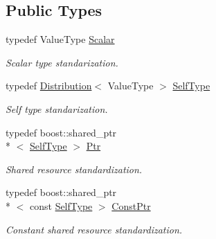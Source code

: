 \subsection*{Public Types}
\begin{DoxyCompactItemize}
\item 
typedef Value\-Type \hyperlink{classffnn_1_1distribution_1_1_distribution_af0757b85660b34a2ae32a285cfdbfd1d}{Scalar}
\begin{DoxyCompactList}\small\item\em Scalar type standarization. \end{DoxyCompactList}\item 
typedef \hyperlink{classffnn_1_1distribution_1_1_distribution}{Distribution}$<$ Value\-Type $>$ \hyperlink{classffnn_1_1distribution_1_1_distribution_ae1a3da8f16a034d6c051fcfdcf69f0d2}{Self\-Type}
\begin{DoxyCompactList}\small\item\em Self type standarization. \end{DoxyCompactList}\item 
typedef boost\-::shared\-\_\-ptr\\*
$<$ \hyperlink{classffnn_1_1distribution_1_1_distribution_ae1a3da8f16a034d6c051fcfdcf69f0d2}{Self\-Type} $>$ \hyperlink{classffnn_1_1distribution_1_1_distribution_a51d4ea875b70b07862c5f68b20c8f41a}{Ptr}
\begin{DoxyCompactList}\small\item\em Shared resource standardization. \end{DoxyCompactList}\item 
typedef boost\-::shared\-\_\-ptr\\*
$<$ const \hyperlink{classffnn_1_1distribution_1_1_distribution_ae1a3da8f16a034d6c051fcfdcf69f0d2}{Self\-Type} $>$ \hyperlink{classffnn_1_1distribution_1_1_distribution_a829c8056b31313f6196f5659ca9503cc}{Const\-Ptr}
\begin{DoxyCompactList}\small\item\em Constant shared resource standardization. \end{DoxyCompactList}\end{DoxyCompactItemize}
